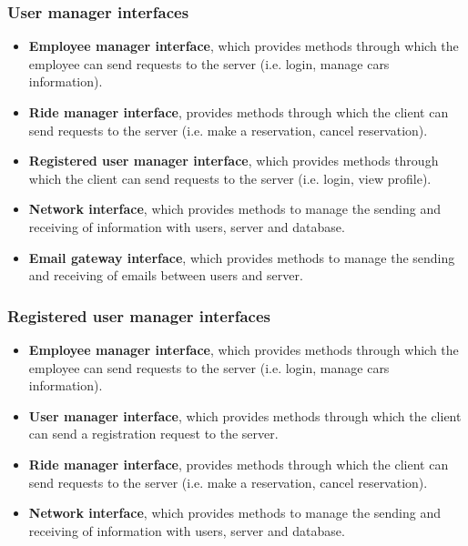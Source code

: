 \subsubsection{User manager interfaces}
\begin{itemize}
	\item \textbf{Employee manager interface}, which provides methods through which the employee can send requests to the server (i.e. login, manage cars information).
	\item \textbf{Ride manager interface}, provides methods through which the client can send requests to the server (i.e. make a reservation, cancel reservation).
	\item \textbf{Registered user manager interface}, which provides methods through which the client can send requests to the server (i.e. login, view profile).
	\item \textbf{Network interface}, which provides methods to manage the sending and receiving of information with users, server and database.
	\item \textbf{Email gateway interface}, which provides methods to manage the sending and receiving of emails between users and server.
\end{itemize}
\subsubsection{Registered user manager interfaces}
\begin{itemize}
	\item \textbf{Employee manager interface}, which provides methods through which the employee can send requests to the server (i.e. login, manage cars information).
	\item \textbf{User manager interface}, which provides methods through which the client can send a registration request to the server.
	\item \textbf{Ride manager interface}, provides methods through which the client can send requests to the server (i.e. make a reservation, cancel reservation).
	\item \textbf{Network interface}, which provides methods to manage the sending and receiving of information with users, server and database.
\end{itemize}
